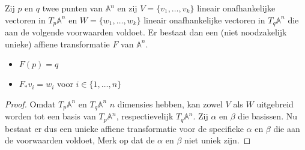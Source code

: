 \documentclass[main.tex]{subfiles}
\begin{document}
\begin{gev}
  Zij $p$ en $q$ twee punten van $\mathbb{A}^{n}$ en zij $V = \{v_{1},\dotsc,v_{k}\}$ lineair onafhankelijke vectoren in $T_{p}\mathbb{A}^{n}$ en $W = \{w_{1},\dotsc,w_{k}\}$ lineair onafhankelijke vectoren in $T_{q}\mathbb{A}^{n}$ die aan de volgende voorwaarden voldoet.
  Er bestaat dan een (niet noodzakelijk unieke) affiene transformatie $F$ van $\mathbb{A}^{n}$.
  \begin{itemize}
  \item $F(p) = q$
  \item $F_{*}v_{i} = w_{i}$ voor $i \in \{ 1,\dotsc,n \}$
  \end{itemize}

  \begin{proof}
    Omdat $T_{p}\mathbb{A}^{n}$ en $T_{q}\mathbb{A}^{n}$ $n$ dimensies hebben, kan zowel $V$ als $W$ uitgebreid worden tot een basis van $T_{p}\mathbb{A}^{n}$, respectievelijk $T_{q}\mathbb{A}^{n}$.
    Zij $\alpha$ en $\beta$ die basissen.
    Nu bestaat er dus een unieke affiene transformatie voor de specifieke $\alpha$ en $\beta$ die aan de voorwaarden voldoet,
    Merk op dat de $\alpha$ en $\beta$ niet uniek zijn.
  \end{proof}
\end{gev}
\end{document}
